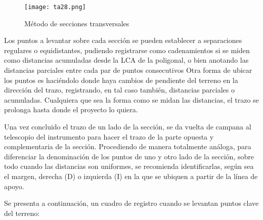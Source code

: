 \begin{figure}[h!]
  \centerline{\texttt{[image: ta28.png]}}
  \caption{Método de secciones transversales}
  \label{ta28}
\end{figure}

Los puntos a levantar sobre cada sección se pueden establecer a separaciones regulares o equidistantes, pudiendo registrarse como cadenamientos si se miden como distancias acumuladas desde la LCA de la poligonal, o bien anotando las distancias parciales entre cada par de puntos consecutivos
Otra forma de ubicar los puntos es haciéndolo donde haya cambios de pendiente del terreno en la dirección del trazo, registrando, en tal caso también, distancias parciales o acumuladas.
Cualquiera que sea la forma como se midan las distancias, el trazo se prolonga hasta donde el proyecto lo quiera.

Una vez concluido el trazo de un lado de la sección, se da vuelta de campana al telescopio del instrumento para hacer el trazo de la parte opuesta y complementaria de la sección. Procediendo de manera totalmente análoga, para diferenciar la denominación de los puntos de uno y otro lado de la sección, sobre todo cuando las distancias son uniformes, se recomienda identificarlas, según sea el margen, derecha (D) o izquierda (I) en la que se ubiquen a partir de la línea de apoyo.

Se presenta a continuación, un cuadro de registro cuando se levantan puntos clave del terreno: 

